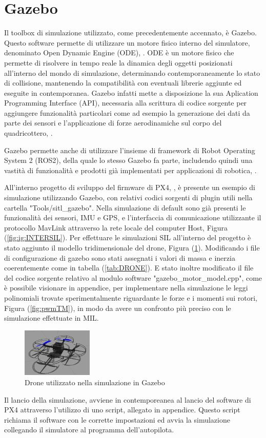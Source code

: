 \section{Gazebo}
\label{section:gazebo}

Il toolbox di simulazione utilizzato, come precedentemente accennato, è Gazebo. Questo software permette di utilizzare un motore fisico interno del simulatore, denominato Open Dynamic Engine (ODE), \cite{ODE}. ODE è un motore fisico che permette di risolvere in tempo reale la dinamica degli oggetti posizionati all'interno del mondo di simulazione, determinando contemporaneamente lo stato di collisione, mantenendo la compatibilità con eventuali librerie aggiunte ed eseguite in contemporanea. Gazebo infatti mette a disposizione la sua Aplication Programming Interface (API), necessaria alla scrittura di codice sorgente per aggiungere funzionalità particolari come ad esempio la generazione dei dati da parte dei sensori e l'applicazione di forze aerodinamiche sul corpo del quadricottero, \cite{Gazebo}. 

Gazebo permette anche di utilizzare l'insieme di framework di Robot Operating System 2 (ROS2), della quale lo stesso Gazebo fa parte, includendo quindi una vastità di funzionalità e prodotti già implementati per applicazioni di robotica, \cite{ROSGAZEBO}.

All'interno progetto di sviluppo del firmware di PX4, \cite{PX4FIRMWARE}, è presente un esempio di simulazione utilizzando Gazebo, con relativi codici sorgenti di plugin utili nella cartella "Tools/sitl\_gazebo". Nella simulazione di default sono già presenti le funzionalità dei sensori, IMU e GPS, e l'interfaccia di comunicazione utilizzante il protocollo MavLink attraverso la rete locale del computer Host, Figura (\ref{fig:ig:INTERSIL}).
Per effettuare le simulazioni SIL all'interno del progetto è stato aggiunto il modello tridimensionale del drone, Figura (\ref{fig:DRONECAD}). Modificando i file di configurazione di gazebo sono stati assegnati i valori di massa e inerzia coerentemente come in tabella (\ref{tab:DRONE}).
E stato inoltre modificato il file del codice sorgente relativo al modulo software "gazebo\_motor\_model.cpp", come è possibile visionare in appendice, per implementare nella simulazione le leggi polinomiali trovate sperimentalmente riguardante le forze e i momenti sui rotori, Figura (\ref{fig:pwmTM}), in modo da avere un confronto più preciso con le simulazione effettuate in MIL.

\begin{figure}
	\centering
	\includegraphics[width=0.3\textwidth]{DescrizioneAutopilota/Figure/DRONECAD}
	\caption{Drone utilizzato nella simulazione in Gazebo}
	\label{fig:DRONECAD}
\end{figure}

Il lancio della simulazione, avviene in contemporeanea al lancio del software di PX4 attraverso l'utilizzo di uno script, allegato in appendice. Questo script richiama il software con le corrette impostazioni ed avvia la simulazione collegando il simulatore al programma dell'autopilota.
